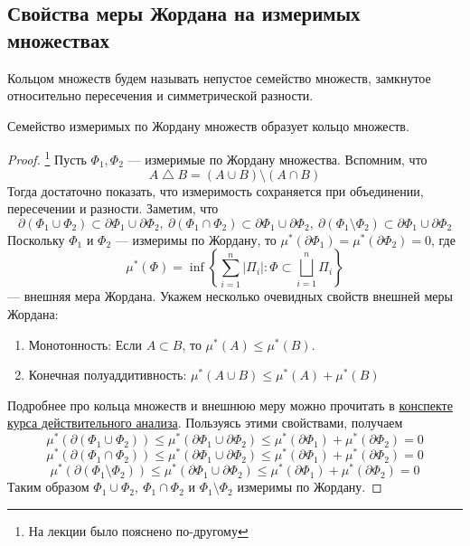 \subsection{Свойства меры Жордана на измеримых множествах}
\begin{definition}
    Кольцом множеств будем называть непустое семейство множеств, замкнутое относительно пересечения и симметрической разности.
\end{definition}
\begin{statement}
    Семейство измеримых по Жордану множеств образует кольцо множеств.
\end{statement}
\begin{proof}\footnote{На лекции было пояснено по-другому}
    Пусть $\Phi_1, \Phi_2$ --- измеримые по Жордану множества. Вспомним, что
    \[A\bigtriangleup B=(A\cup B)\setminus (A\cap B)\]
    Тогда достаточно показать, что измеримость сохраняется при объединении, пересечении и разности. Заметим, что
    \[\partial(\Phi_1\cup \Phi_2)\subset \partial \Phi_1 \cup \partial \Phi_2,\ \partial(\Phi_1\cap \Phi_2)\subset \partial \Phi_1 \cup \partial \Phi_2,\ \partial(\Phi_1\setminus \Phi_2)\subset \partial \Phi_1 \cup \partial \Phi_2\]
    Поскольку $\Phi_1$ и $\Phi_2$ --- измеримы по Жордану, то $\mu^*(\partial\Phi_1)=\mu^*(\partial\Phi_2)=0$, где 
    \[\mu^*(\Phi)=\inf\left\{ \sum\limits_{i=1}^{n}|\Pi_i|: \Phi\subset \bigsqcup\limits_{i=1}^n\Pi_i \right\}\]
    --- внешняя мера Жордана. Укажем несколько очевидных свойств внешней меры Жордана:
    \begin{enumerate}
        \item Монотонность: Если $A\subset B$, то $\mu^*(A)\leq \mu^*(B)$.
        \item Конечная полуаддитивность: $\mu^*(A\cup B)\leq \mu^*(A)+\mu^*(B)$
    \end{enumerate}
    Подробнее про кольца множеств и внешнюю меру можно прочитать в \href{https://github.com/betel-git/Real-Analysis}{конспекте курса действительного анализа}. Пользуясь этими свойствами, получаем
    \[\mu^*(\partial (\Phi_1\cup \Phi_2))\leq \mu^*(\partial\Phi_1\cup\partial\Phi_2)\leq \mu^*(\partial \Phi_1)+\mu^*(\partial\Phi_2)=0\]
    \[\mu^*(\partial(\Phi_1\cap \Phi_2))\leq \mu^*(\partial\Phi_1\cup\partial\Phi_2)\leq \mu^*(\partial\Phi_1)+\mu^*(\partial\Phi_2)=0\]
    \[\mu^*(\partial(\Phi_1\setminus \Phi_2))\leq \mu^*(\partial\Phi_1\cup\partial\Phi_2)\leq \mu^*(\partial\Phi_1)+\mu^*(\partial\Phi_2)=0\]
    Таким образом $\Phi_1\cup \Phi_2,\ \Phi_1\cap \Phi_2$ и $\Phi_1\setminus \Phi_2$ измеримы по Жордану.
\end{proof}
